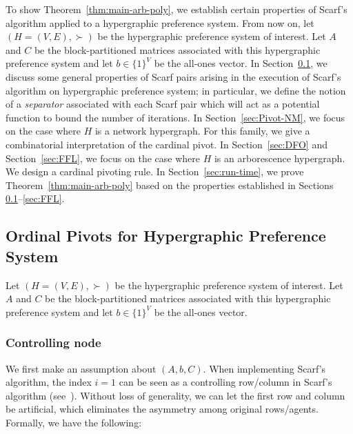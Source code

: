 \documentclass[11pt]{article}
\begin{document}
To show Theorem~\ref{thm:main-arb-poly}, we establish certain properties of Scarf's algorithm applied to a hypergraphic preference system. From now on, let $(H=(V,E),\succ)$ be the hypergraphic preference system of interest. Let $A$ and $C$ be the block-partitioned matrices associated with this hypergraphic preference system and let $b\in \{1\}^V$ be the all-ones vector. 
In Section~\ref{sec:scarf-deep}, we discuss some general properties of Scarf pairs arising in the execution of Scarf's algorithm on hypergraphic preference system; in particular, we define the notion of a \emph{separator} associated with each Scarf pair which will act as a potential function to bound the number of iterations. In Section~\ref{sec:Pivot-NM}, we focus on the case where $H$ is a network hypergraph. For this family, we give a combinatorial interpretation of the cardinal pivot. In Section~\ref{sec:DFO} and Section~\ref{sec:FFL}, we focus on the case where $H$ is an arborescence hypergraph. We design a cardinal pivoting rule. In Section~\ref{sec:run-time}, we prove Theorem~\ref{thm:main-arb-poly} based on the properties established in Sections \ref{sec:scarf-deep}--\ref{sec:FFL}.




\subsection{Ordinal Pivots for Hypergraphic Preference System}\label{sec:scarf-deep}


Let $(H=(V,E),\succ)$ be the hypergraphic preference system of interest. Let $A$ and $C$ be the block-partitioned matrices associated with this hypergraphic preference system and let $b\in \{1\}^V$ be the all-ones vector. 


\subsubsection{Controlling node} 
We first make an assumption about $(A,b,C)$. When implementing Scarf's algorithm, the index $i=1$ can be seen as a controlling row/column in Scarf's algorithm (see~\cite{scarf1967core}). Without loss of generality, we can let the first row and column be artificial, which eliminates the asymmetry among original rows/agents. Formally, we have the following:
\end{document}
